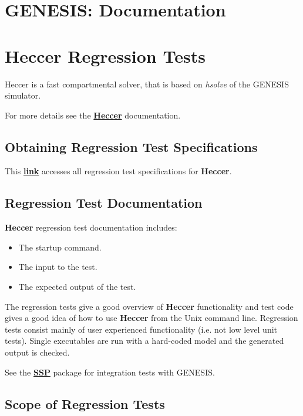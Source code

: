 \documentclass[12pt]{article}
\begin{document}
\section*{GENESIS: Documentation}

\section*{Heccer Regression Tests}

Heccer is a fast compartmental solver, that is based on {\it hsolve} of the GENESIS simulator.

For more details see the \href{../heccer/heccer.tex}{\bf Heccer} documentation.

\subsection*{Obtaining Regression Test Specifications}

This \href{http://neurospaces.sourceforge.net/neurospaces_project/heccer/tests/html/index.html}{\bf link} accesses all regression test specifications for {\bf Heccer}.

\subsection*{Regression Test Documentation}

{\bf Heccer} regression test documentation includes:
\begin{itemize}
\item The startup command.
\item The input to the test.
\item The expected output of the test.
\end{itemize}
The regression tests give a good overview of {\bf Heccer} functionality and test code gives a good idea of how to use {\bf Heccer} from the Unix command line. Regression tests consist mainly of user experienced functionality (i.e. not low level unit tests). Single executables are run with a hard-coded model and the generated output is checked.

See the \href{../ssp/ssp.tex}{\bf SSP} package for integration tests with GENESIS.

\subsection*{Scope of Regression Tests}
\end{document}
